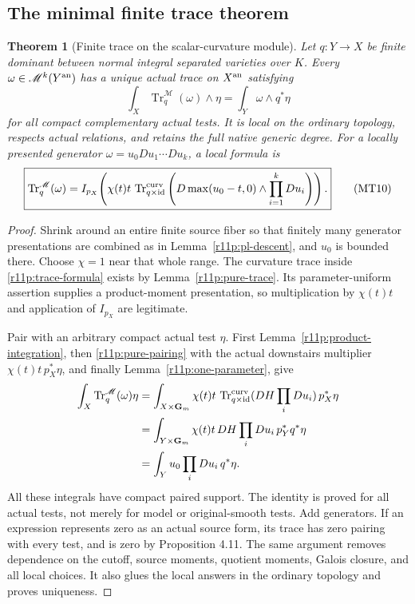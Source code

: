 \documentclass[11pt,a4paper]{article}
\newtheorem{theorem}{Theorem}[section]
\theoremstyle{definition}
\theoremstyle{remark}
\begin{document}
\subsection{The minimal finite trace theorem}

\begin{theorem}[Finite trace on the scalar-curvature module]
\label{r11p:minimal-trace-theorem}
Let $q:Y\to X$ be finite dominant between normal integral separated
varieties over $K$.  Every $\omega\in\mathscr M^k(Y^{\rm an})$ has a
unique actual trace on $X^{\rm an}$ satisfying
\[
                 \int_X\operatorname{Tr}^{\mathscr M}_q(\omega)
                                      \wedge\eta
                          =\int_Y\omega\wedge q^*\eta
\tag{MT9}\label{r11p:minimal-pairing}
\]
for all compact complementary actual tests.  It is local on the
ordinary topology, respects actual relations, and retains the full
native generic degree.  For a locally presented generator
$\omega=u_0Du_1\cdots Du_k$, a local formula is
\[
 \boxed{\displaystyle
 \operatorname{Tr}^{\mathscr M}_q(\omega)
 = I_{p_X}\!\left(
     \chi(t)t\,
     \operatorname{Tr}^{\rm curv}_{q\times\operatorname{id}}
       \left(D\max(u_0-t,0)\wedge\prod_{i=1}^kDu_i\right)
                         \right).}
\tag{MT10}\label{r11p:trace-formula}
\]
\end{theorem}

\begin{proof}
Shrink around an entire finite source fiber so that finitely many
generator presentations are combined as in
Lemma~\ref{r11p:pl-descent}, and $u_0$ is bounded there.  Choose
$\chi=1$ near that whole range.  The curvature trace inside
\eqref{r11p:trace-formula} exists by Lemma~\ref{r11p:pure-trace}.
Its parameter-uniform assertion supplies a product-moment presentation,
so multiplication by $\chi(t)t$ and application of $I_{p_X}$ are
legitimate.

Pair with an arbitrary compact actual test $\eta$.  First
Lemma~\ref{r11p:product-integration}, then
\eqref{r11p:pure-pairing} with the actual downstairs multiplier
$\chi(t)t\,p_X^*\eta$, and finally
Lemma~\ref{r11p:one-parameter}, give
\[
\begin{split}
 \int_X\operatorname{Tr}^{\mathscr M}_q(\omega)\eta
 &=\int_{X\times\mathbf G_m}\chi(t)t\,
     \operatorname{Tr}^{\rm curv}_{q\times\operatorname{id}}
        (DH\prod_iDu_i)\,p_X^*\eta\\
 &=\int_{Y\times\mathbf G_m}\chi(t)t\,DH\prod_iDu_i\,
                                          p_Y^*q^*\eta\\
 &=\int_Yu_0\prod_iDu_i\,q^*\eta.
\end{split}
\]
All these integrals have compact paired support.  The identity is
proved for all actual tests, not merely for model or original-smooth
tests.  Add generators.  If an expression represents zero as an
actual source form, its trace has zero pairing with every test, and
is zero by Proposition 4.11.  The same argument removes dependence
on the cutoff, source moments, quotient moments, Galois closure, and
all local choices.  It also glues the local answers in the ordinary
topology and proves uniqueness.
\end{proof}
\end{document}
